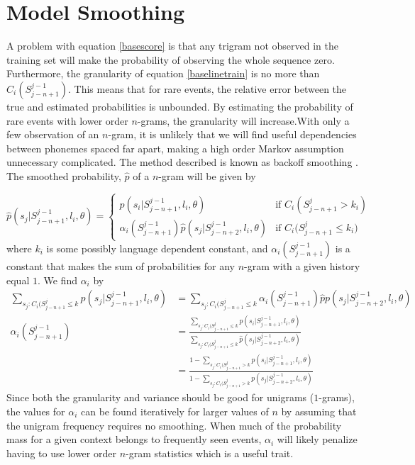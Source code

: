 \section{Model Smoothing}
\label{sect:basesmooth}

A problem with equation \ref{basescore} is that any trigram not observed in the training set will make the probability of observing the whole sequence zero.  Furthermore, the granularity of equation \ref{baselinetrain} is no more than $C_i(S_{j-n+1}^{j-1})$. This means that for rare events, the relative error between the true and estimated probabilities is unbounded. By estimating the probability of rare events with lower order $n$-grams, the granularity will increase.With only a few observation of an $n$-gram, it is unlikely that we will find useful dependencies between phonemes spaced far apart, making a high order Markov assumption unnecessary complicated. The method described is known as backoff smoothing \cite[p. 559]{talegk}. The smoothed probability, $\hat{p}$ of a $n$-gram will be given by

\begin{equation}
\label{basesmooth}
\hat{p}(s_j|S_{j-n+1}^{j-1}, l_i, \theta) = 
\begin{cases}
p(s_i|S_{j-n+1}^{j-1}, l_i, \theta) & \text{if $C_i(S_{j-n+1}^j > k_i)$} \\
\alpha_i(S_{j-n+1}^{j-1})\hat{p}(s_j|S_{j-n+2}^{j-1}, l_i, \theta) & \text{if $C_i(S_{j-n+1}^j \leq k_i$)}
\end{cases}
\end{equation}
where $k_i$ is some possibly language dependent constant, and $\alpha_i(S_{j-n+1}^{j-1})$ is a constant that makes the sum of probabilities for any $n$-gram with a given history equal $1$. We find $\alpha_i$ by 
\begin{align}
\sum_{s_j:C_i(S_{j-n+1}^j \leq k} p(s_j | S_{j-n+1}^{j-1}, l_i, \theta)
&= \sum_{s_j:C_i(S_{j-n+1}^j \leq k} \alpha_i(S_{j-n+1}^{j-1})\hat{p}p(s_j | S_{j-n+2}^{j-1}, l_i, \theta) \nonumber \\
\alpha_i(S_{j-n+1}^{j-1})
&= \frac{\sum_{s_j:C_i(S_{j-n+1}^j \leq k}p(s_i|S_{j-n+1}^{j-1}, l_i, \theta)}{\sum_{s_j:C_i(S_{j-n+1}^j \leq k}\hat{p}(s_j | S_{j-n+2}^{j-1}, l_i, \theta)} \nonumber \\
&=\frac{1-\sum_{s_j:C_i(S_{j-n+1}^j > k}p(s_i|S_{j-n+1}^{j-1}, l_i, \theta)}{1-\sum_{s_j:C_i(S_{j-n+1}^j > k}p(s_j | S_{j-n+2}^{j-1}, l_i, \theta)}
\end{align}
Since both the granularity and variance should be good for unigrams ($1$-grams), the values for $\alpha_i$ can be found iteratively for larger values of $n$ by assuming that the unigram frequency requires no smoothing. When much of the probability mass for a given context belongs to frequently seen events, $\alpha_i$ will likely penalize having to use lower order $n$-gram statistics which is a useful trait. 